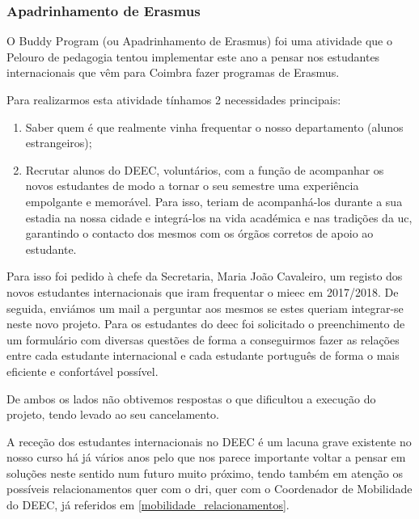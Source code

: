 
\subsubsection{Apadrinhamento de Erasmus}

O Buddy Program (ou Apadrinhamento de Erasmus) foi uma atividade que o Pelouro de pedagogia tentou implementar este ano a pensar nos estudantes internacionais que vêm para Coimbra fazer programas de Erasmus.

Para realizarmos esta atividade tínhamos 2 necessidades principais:
\begin{enumerate}
\item Saber quem é que realmente vinha frequentar o nosso departamento (alunos estrangeiros);
\item Recrutar alunos do DEEC, voluntários, com a função de acompanhar os novos estudantes de modo a tornar o seu semestre uma experiência empolgante e memorável. Para isso, teriam de acompanhá-los durante a sua estadia na nossa cidade e integrá-los na vida académica e nas tradições da \acrshort{uc}, garantindo o contacto dos mesmos com os órgãos corretos de apoio ao estudante.
\end{enumerate}

Para isso foi pedido à chefe da Secretaria, Maria João Cavaleiro, um registo dos novos estudantes internacionais que iram frequentar o \acrshort{mieec} em 2017/2018. De seguida, enviámos um mail a perguntar aos mesmos se estes queriam integrar-se neste novo projeto. Para os estudantes do \acrshort{deec} foi solicitado o preenchimento de um formulário com diversas questões de forma a conseguirmos fazer as relações entre cada estudante internacional e cada estudante português de forma o mais eficiente e confortável possível.

De ambos os lados não obtivemos respostas o que dificultou a execução do projeto, tendo levado ao seu cancelamento.

A receção dos estudantes internacionais no DEEC é um lacuna grave existente no nosso curso há já vários anos pelo que nos parece importante voltar a pensar em soluções neste sentido num futuro muito próximo, tendo também em atenção os possíveis relacionamentos quer com o \acrshort{dri}, quer com o Coordenador de Mobilidade do DEEC, já referidos em \ref{mobilidade_relacionamentos}.